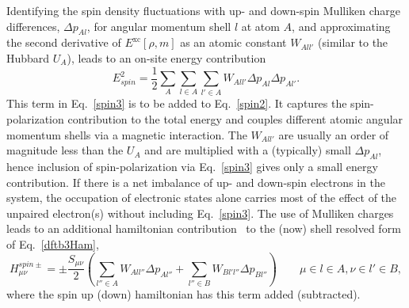 \documentclass[reprint,onecolumn,superscriptaddress]{revtex4-1}
\begin{document}
Identifying the spin density fluctuations with up- and down-spin Mulliken charge
differences, $\Delta p_{Al}$, for angular momentum shell $l$ at atom $A$, and
approximating the second derivative of $E^{\text{xc}}[\rho,m]$ as an atomic
constant $W_{All'}$ (similar to the Hubbard $U_A$), leads to an on-site energy
contribution
\begin{equation}
  E^2_{spin}=\frac{1}{2}\sum_{A}\sum_{l \in A} \sum_{l' \in A} W_{All'} \Delta
  p_{Al}\Delta p_{Al'}.\label{spin3}
\end{equation}
This term in Eq.~\eqref{spin3} is to be added to Eq.~\eqref{spin2}. It captures
the spin-polarization contribution to the total energy and couples different
atomic angular momentum shells via a magnetic interaction. The $W_{All'}$ are
usually an order of magnitude less than the $U_A$ and are multiplied with a
(typically) small $\Delta p_{Al}$, hence inclusion of spin-polarization via
Eq.~\eqref{spin3} gives only a small energy contribution. If there is a net
imbalance of up- and down-spin electrons in the system, the occupation of
electronic states alone carries most of the effect of the unpaired electron(s)
without including Eq.~\eqref{spin3}.  The use of Mulliken charges leads to an
additional hamiltonian contribution~\cite{Koehler2005} to the (now) shell
resolved form of Eq.~\eqref{dftb3Ham},
\begin{equation}
  H^{spin\pm}_{\mu\nu} = \pm \frac{S_{\mu\nu}}{2} \left( \sum\limits_{l'' \in A}
  W_{All''}\Delta p_{Al''} + \sum\limits_{l'' \in B} W_{Bl'l''}\Delta
  p_{Bl''}\right)\qquad{\mu \in l \in A, \nu \in l' \in B,}\label{spin4}
\end{equation}
where the spin up (down) hamiltonian has this term added (subtracted).
\end{document}
